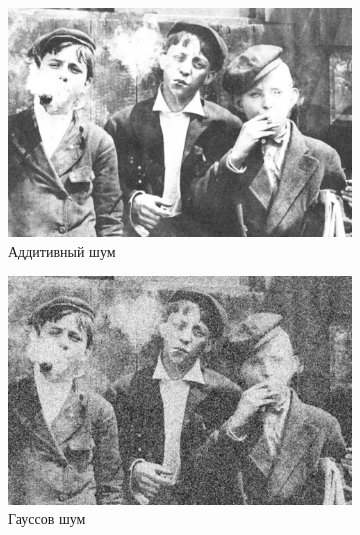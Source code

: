 \begin{figure}[ht!]
\begin{subfigure}[b]{0.5\linewidth}
      \includegraphics[width=0.95\linewidth]{../Contraharmonic_Filter/Contraharmonic_Additive_noise_(m,n=(3,_3),q=0.5).jpg} 
      \caption{Аддитивный шум} 
      \label{contraharmonic_0.5:c} 
      \vspace{4ex}
    \end{subfigure}%
    \begin{subfigure}[b]{0.5\linewidth}
      \centering
      \includegraphics[width=0.95\linewidth]{../Contraharmonic_Filter/Contraharmonic_Gaussian_noise_(m,n=(3,_3),q=0.5).jpg} 
      \caption{Гауссов шум} 
      \label{contraharmonic_0.5:d} 
      \vspace{4ex}
    \end{subfigure}
    \begin{subfigure}[b]{0.5\linewidth}
      \centering

\end{subfigure}
\end{figure}
